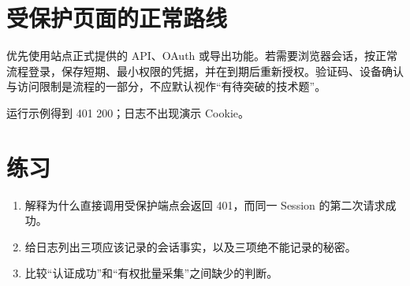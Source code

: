 \section{受保护页面的正常路线}
优先使用站点正式提供的 API、OAuth 或导出功能。若需要浏览器会话，按正常流程登录，保存短期、最小权限的凭据，并在到期后重新授权。验证码、设备确认与访问限制是流程的一部分，不应默认视作“有待突破的技术题”。

\begin{tcolorbox}[title=本章验收,colframe=Teal,colback=Teal!3]
运行示例得到 401 200；日志不出现演示 Cookie。
\end{tcolorbox}

\section{练习}
\begin{enumerate}[label=\arabic*.]
\item 解释为什么直接调用受保护端点会返回 401，而同一 Session 的第二次请求成功。
\item 给日志列出三项应该记录的会话事实，以及三项绝不能记录的秘密。
\item 比较“认证成功”和“有权批量采集”之间缺少的判断。
\end{enumerate}
